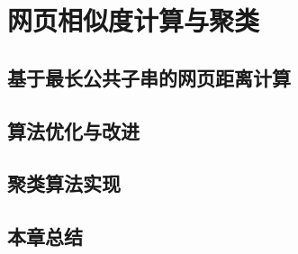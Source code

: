 
\chapter{网页相似度计算与聚类}
\label{chap:cluster}

\section{基于最长公共子串的网页距离计算}
\label{sec:lcs}

\section{算法优化与改进}
\label{sec:optimize}

\section{聚类算法实现}
\label{sec:clusteralgo}

\section{本章总结}
\label{sec:summarycluster}



